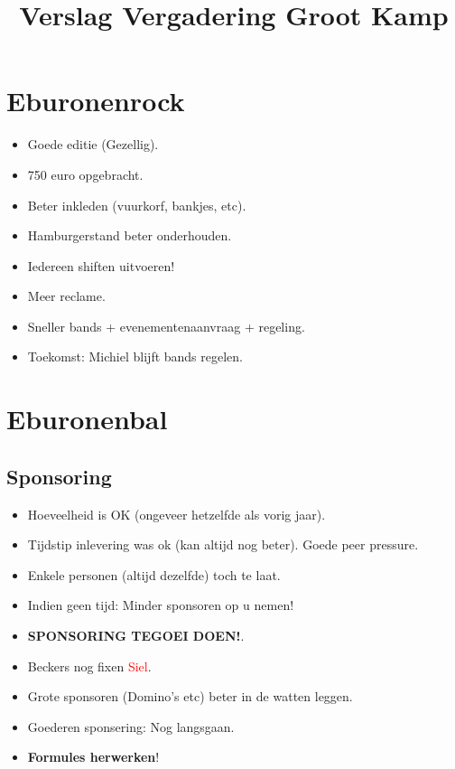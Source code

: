 \documentclass[pdftex,12pt,a4paper,english,titlepage]{article}
\title{Verslag Vergadering Groot Kamp}
\begin{document}
	
\maketitle

\newpage

\tableofcontents

\newpage

\section{Eburonenrock}
\begin{itemize}
	\item Goede editie (Gezellig).
	\item 750 euro opgebracht.
	\item Beter inkleden (vuurkorf, bankjes, etc).
	\item Hamburgerstand beter onderhouden.
	\item Iedereen shiften uitvoeren!
	\item Meer reclame.
	\item Sneller bands + evenementenaanvraag + regeling.
	\item Toekomst: Michiel blijft bands regelen.
\end{itemize}

\section{Eburonenbal}

\subsection{Sponsoring}
\begin{itemize}
	\item Hoeveelheid is OK (ongeveer hetzelfde als vorig jaar).
	\item Tijdstip inlevering was ok (kan altijd nog beter). Goede peer pressure.
	\item Enkele personen (altijd dezelfde) toch te laat.
	\item Indien geen tijd: Minder sponsoren op u nemen!
	\item \textbf{SPONSORING TEGOEI DOEN!}.
	\item Beckers nog fixen \textcolor{red}{Siel}.
	\item Grote sponsoren (Domino's etc) beter in de watten leggen.
	\item Goederen sponsering: Nog langsgaan.
	\item \textbf{Formules herwerken}!
\end{itemize}
\end{document}
